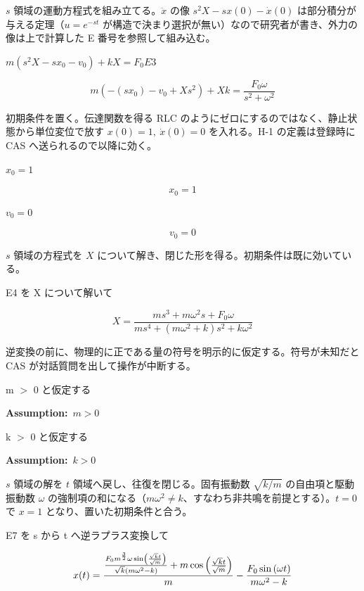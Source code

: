 \documentclass[dvipdfmx,a4paper,11pt]{jsarticle}
\begin{document}
$s$ 領域の運動方程式を組み立てる。$\ddot x$ の像 $s^2X - s x(0) - \dot x(0)$ は部分積分が与える定理（$u=e^{-st}$ が構造で決まり選択が無い）なので研究者が書き、外力の像は上で計算した E 番号を参照して組み込む。

$m (s^2 X - s x_0 - v_0) + k X = F_0 E3$

\begin{equation}
  m \left(-\left(s x_{0}\right)-v_{0}+X s^2\right)+X k=\frac{F_{0} \omega}{s^2+\omega^2}
  \label{eq:E4}
\end{equation}

初期条件を置く。伝達関数を得る RLC のようにゼロにするのではなく、静止状態から単位変位で放す $x(0)=1,\ \dot x(0)=0$ を入れる。H-1 の定義は登録時に CAS へ送られるので以降に効く。

$x_0 = 1$

\begin{equation}
  x_0 = 1
  \label{eq:E5}
\end{equation}

$v_0 = 0$

\begin{equation}
  v_0 = 0
  \label{eq:E6}
\end{equation}

$s$ 領域の方程式を $X$ について解き、閉じた形を得る。初期条件は既に効いている。

E4 を X について解いて

\begin{equation}
  X = \frac{m s^3+m \omega^2 s+F_{0} \omega}{m s^4+\left(m \omega^2+k\right) s^2+k \omega^2}
  \label{eq:E7}
\end{equation}

逆変換の前に、物理的に正である量の符号を明示的に仮定する。符号が未知だと CAS が対話質問を出して操作が中断する。

m $>$ 0 と仮定する

\noindent\textbf{Assumption:}\ $\displaystyle m > 0$\par

k $>$ 0 と仮定する

\noindent\textbf{Assumption:}\ $\displaystyle k > 0$\par

$s$ 領域の解を $t$ 領域へ戻し、往復を閉じる。固有振動数 $\sqrt{k/m}$ の自由項と駆動振動数 $\omega$ の強制項の和になる（$m\omega^2 \ne k$、すなわち非共鳴を前提とする）。$t=0$ で $x=1$ となり、置いた初期条件と合う。

E7 を s から t へ逆ラプラス変換して

\begin{equation}
  x(t) = {{{{F_{0} m^{\frac{3}{2}} \omega \sin \left(\frac{\sqrt{k} t}{\sqrt{m}}\right)}\over{\sqrt{k} \left(m \omega^2-k\right)}}+m \cos \left(\frac{\sqrt{k} t}{\sqrt{m}}\right)}\over{m}}-\frac{F_{0} \sin \left(\omega t\right)}{m \omega^2-k}
  \label{eq:E8}
\end{equation}
\end{document}
